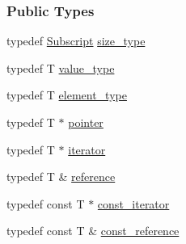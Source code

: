 \subsubsection*{Public Types}
\begin{DoxyCompactItemize}
\item 
typedef \hyperlink{namespace_t_n_t_af22e3f1460e145c04ce4e7d701e4c1c1}{Subscript} \hyperlink{class_t_n_t_1_1_vector_adf52e96536358fcc4507fd08402aa07f}{size\_\-type}
\item 
typedef T \hyperlink{class_t_n_t_1_1_vector_a329d23fe25894a94d461353dd9c7c1be}{value\_\-type}
\item 
typedef T \hyperlink{class_t_n_t_1_1_vector_af87934ec2406d242f6cc98035686bd1f}{element\_\-type}
\item 
typedef T $\ast$ \hyperlink{class_t_n_t_1_1_vector_aacdf3935ca58837be7e80d21d8e17c6d}{pointer}
\item 
typedef T $\ast$ \hyperlink{class_t_n_t_1_1_vector_a7289b2334c4c28181bb4193fa32fc48a}{iterator}
\item 
typedef T \& \hyperlink{class_t_n_t_1_1_vector_a9cdf62749080406bdf3fbace264dac85}{reference}
\item 
typedef const T $\ast$ \hyperlink{class_t_n_t_1_1_vector_a9a825ae9b3cb568a7b02449da6e9779f}{const\_\-iterator}
\item 
typedef const T \& \hyperlink{class_t_n_t_1_1_vector_a2957faed9560f1f53bc5943a160d71bf}{const\_\-reference}
\end{DoxyCompactItemize}
